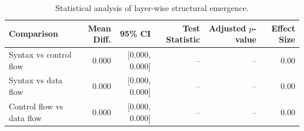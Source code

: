 \begin{table}[t]
\centering
\caption{Statistical analysis of layer-wise structural emergence.}
\label{tab:emerge}
\begin{tabular}{lrrrrr}
\toprule
Comparison & Mean Diff. & 95\% CI & Test Statistic & Adjusted $p$-value & Effect Size \\
\midrule
Syntax vs control flow & 0.000 & [0.000, 0.000] & -- & -- & 0.00 \\
Syntax vs data flow & 0.000 & [0.000, 0.000] & -- & -- & 0.00 \\
Control flow vs data flow & 0.000 & [0.000, 0.000] & -- & -- & 0.00 \\
\bottomrule
\end{tabular}
\end{table}
